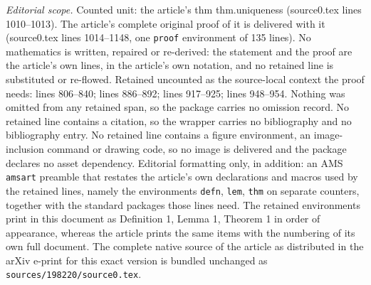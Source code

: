 \documentclass[10pt,a4paper]{amsart}
\begin{document}
\noindent\textit{Editorial scope.} Counted unit: the article's thm thm.uniqueness (source0.tex lines 1010--1013). The article's complete original proof of it is delivered with it (source0.tex lines 1014--1148, one \texttt{proof} environment of 135 lines). No mathematics is written, repaired or re-derived: the statement and the proof are the article's own lines, in the article's own notation, and no retained line is substituted or re-flowed.  Retained uncounted as the source-local context the proof needs: lines 806--840; lines 886--892; lines 917--925; lines 948--954.  Nothing was omitted from any retained span, so the package carries no omission record.  No retained line contains a citation, so the wrapper carries no bibliography and no bibliography entry.  No retained line contains a figure environment, an image-inclusion command or drawing code, so no image is delivered and the package declares no asset dependency.  Editorial formatting only, in addition: an AMS \texttt{amsart} preamble that restates the article's own declarations and macros used by the retained lines, namely the environments \texttt{defn}, \texttt{lem}, \texttt{thm} on separate counters, together with the standard packages those lines need.  The retained environments print in this document as Definition 1, Lemma 1, Theorem 1 in order of appearance, whereas the article prints the same items with the numbering of its own full document.  The complete native source of the article as distributed in the arXiv e-print for this exact version is bundled unchanged as \texttt{sources/198220/source0.tex}.
\end{document}
